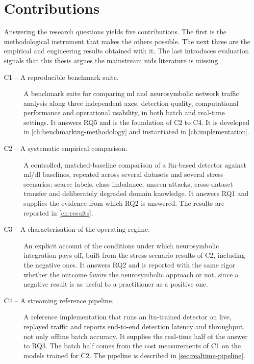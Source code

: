 \section{Contributions}
\label{sec:contributions}

Answering the research questions yields five contributions. The first is the
methodological instrument that makes the others possible. The next three are
the empirical and engineering results obtained with it. The last introduces
evaluation signals that this thesis argues the mainstream \gls{nids}
literature is missing.

\begin{description}
  \item[C1 -- A reproducible benchmark suite.] A benchmark suite for
    comparing \gls{ml} and neurosymbolic network traffic analysis along
    three independent axes, detection quality, computational performance
    and operational usability, in both batch and real-time settings. It
    answers RQ5 and is the foundation of C2 to C4. It is developed in
    \cref{ch:benchmarking-methodology} and instantiated in
    \cref{ch:implementation}.

  \item[C2 -- A systematic empirical comparison.] A controlled,
    matched-baseline comparison of a \gls{ltn}-based detector against
    \gls{ml}/\gls{dl} baselines, repeated across several datasets and
    several stress scenarios: scarce labels, class imbalance, unseen
    attacks, cross-dataset transfer and deliberately degraded domain
    knowledge. It answers RQ1 and supplies the evidence from which RQ2 is
    answered. The results are reported in \cref{ch:results}.

  \item[C3 -- A characterisation of the operating regime.] An explicit
    account of the conditions under which neurosymbolic integration pays
    off, built from the stress-scenario results of C2, including the
    negative ones. It answers RQ2 and is reported with the same rigor
    whether the outcome favors the neurosymbolic approach or not, since a
    negative result is as useful to a practitioner as a positive one.

  \item[C4 -- A streaming reference pipeline.] A reference implementation
    that runs an \gls{ltn}-trained detector on live, replayed traffic and
    reports end-to-end detection latency and throughput, not only offline
    batch accuracy. It supplies the real-time half of the answer to RQ3.
    The batch half comes from the cost measurements of C1 on the models
    trained for C2. The pipeline is described in \cref{sec:realtime-pipeline}.


\end{description}
